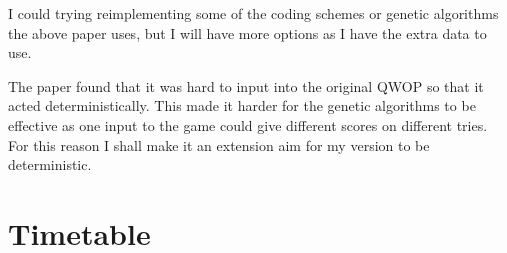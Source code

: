 \documentclass[12pt,a4paper,twoside]{article}
\begin{document}
I could trying reimplementing some of the coding schemes or genetic algorithms the above paper uses, but I will have more options as I have the extra data to use.

The paper found that it was hard to input into the original QWOP so that it acted deterministically.
This made it harder for the genetic algorithms to be effective as one input to the game could give different scores on different tries.
For this reason I shall make it an extension aim for my version to be deterministic.



\section*{Timetable}


\end{document}
